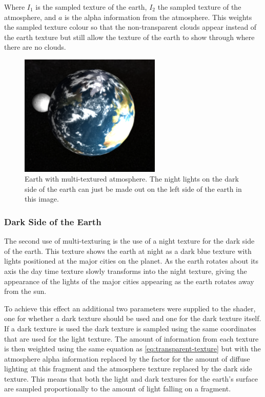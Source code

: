 \documentclass[paper=a4, fontsize=11pt]{scrartcl}	%
\numberwithin{equation}{section}															%
\numberwithin{figure}{section}																%
\numberwithin{table}{section}																%
\begin{document}
Where $I_1$ is the sampled texture of the earth, $I_2$ the sampled texture of the atmosphere, and $a$ is the alpha information from the atmosphere. This weights the sampled texture colour so that the non-transparent clouds appear instead of the earth texture but still allow the texture of the earth to show through where there are no clouds.

\begin{figure}[H]
\centering
\includegraphics[width=0.6\textwidth]{img/earth.png}
\caption{Earth with multi-textured atmosphere. The night lights on the dark side of the earth can just be made out on the left side of the earth in this image.}
\label{fig:earth-multi-texture}
\end{figure}

\subsubsection{Dark Side of the Earth}
The second use of multi-texturing is the use of a night texture for the dark side of the earth. This texture shows the earth at night as a dark blue texture with lights positioned at the major cities on the planet. As the earth rotates about its axis the day time texture slowly transforms into the night texture, giving the appearance of the lights of the major cities appearing as the earth rotates away from the sun. 

To achieve this effect an additional two parameters were supplied to the shader, one for whether a dark texture should be used and one for the dark texture itself. If a dark texture is used the dark texture is sampled using the same coordinates that are used for the light texture. The amount of information from each texture is then weighted using the same equation as \ref{eq:transparent-texture} but with the atmosphere alpha information replaced by the factor for the amount of diffuse lighting at this fragment and the atmosphere texture replaced by the dark side texture. This means that both the light and dark textures for the earth's surface are sampled proportionally to the amount of light falling on a fragment.
\end{document}
